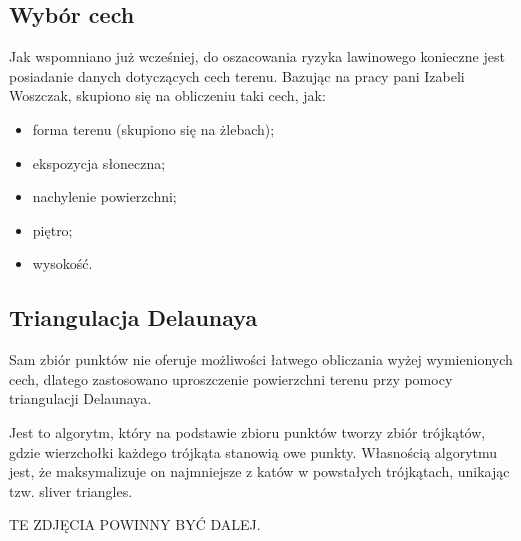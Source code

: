 \subsection{Wybór cech}
Jak wspomniano już wcześniej, do oszacowania ryzyka lawinowego konieczne jest posiadanie danych dotyczących cech terenu. Bazując na pracy pani Izabeli Woszczak, skupiono się na obliczeniu taki cech, jak:
\begin{itemize}
	\item forma terenu (skupiono się na żlebach);
	\item ekspozycja słoneczna;
	\item nachylenie powierzchni;
	\item piętro;
	\item wysokość.
\end{itemize}

\subsection{Triangulacja Delaunaya}
Sam zbiór punktów nie oferuje możliwości łatwego obliczania wyżej wymienionych cech, dlatego zastosowano uproszczenie powierzchni terenu przy pomocy triangulacji Delaunaya.

Jest to algorytm, który na podstawie zbioru punktów tworzy zbiór trójkątów, gdzie wierzchołki każdego trójkąta stanowią owe punkty. Własnością algorytmu jest, że maksymalizuje on najmniejsze z katów w powstałych trójkątach, unikając tzw. sliver triangles.

TE ZDJĘCIA POWINNY BYĆ DALEJ.

